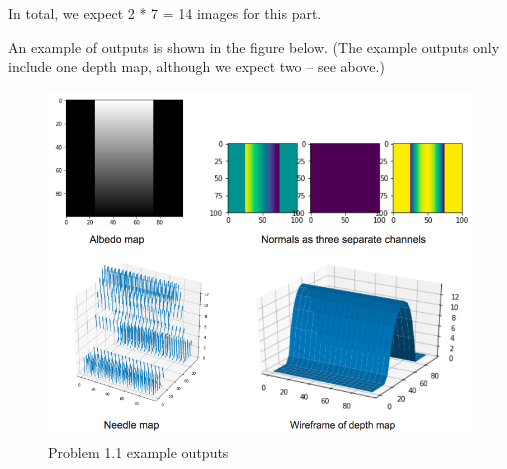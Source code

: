 \documentclass[11pt]{article}
\begin{document}
In total, we expect 2 * 7 = 14 images for this part.

An example of outputs is shown in the figure below. (The example outputs
only include one depth map, although we expect two -- see above.)

\begin{figure}
\centering
\includegraphics{problem1_example.png}
\caption{Problem 1.1 example outputs}
\end{figure}
\end{document}
